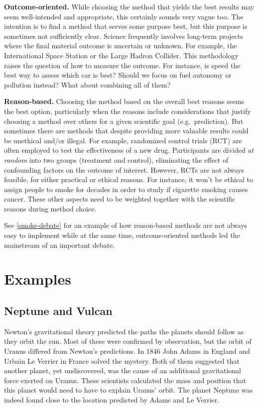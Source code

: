 \documentclass[
]{book}
\begin{document}
\textbf{Outcome-oriented.} While choosing the method that yields the best results may seem well-intended and appropriate, this certainly sounds very vague too. The intention is to find a method that serves some purpose best, but this purpose is sometimes not sufficiently clear. Science frequently involves long-term projects where the final material outcome is uncertain or unknown. For example, the International Space Station or the Large Hadron Collider. This methodology raises the question of how to measure the outcome. For instance, is speed the best way to assess which car is best? Should we focus on fuel autonomy or pollution instead? What about combining all of them?

\textbf{Reason-based.} Choosing the method based on the overall best reasons seems the best option, particularly when the reasons include considerations that justify choosing a method over others for a given scientific goal (e.g.~prediction). But sometimes there are methods that despite providing more valuable results could be unethical and/or illegal. For example, randomized control trials (RCT) are often employed to test the effectiveness of a new drug. Participants are divided \emph{at random} into two groups (treatment and control), eliminating the effect of confounding factors on the outcome of interest. However, RCTs are not always feasible, for either practical or ethical reasons. For instance, it won't be ethical to assign people to smoke for decades in order to study if cigarette smoking causes cancer. These other aspects need to be weighted together with the scientific reasons during method choice.

See \ref{smoke-debate} for an example of how reason-based methods are not always easy to implement while at the same time, outcome-oriented methods led the mainstream of an important debate.

\hypertarget{examples}{%
\section{Examples}\label{examples}}

\hypertarget{neptune-vulcan}{%
\subsection{Neptune and Vulcan}\label{neptune-vulcan}}

Newton's gravitational theory predicted the paths the planets should follow as they orbit the sun. Most of these were confirmed by observation, but the orbit of Uranus differed from Newton's predictions. In 1846 John Adams in England and Urbain Le Verrier in France solved the mystery. Both of them suggested that another planet, yet undiscovered, was the cause of an additional gravitational force exerted on Uranus. These scientists calculated the mass and position that this planet would need to have to explain Uranus' orbit. The planet Neptune was indeed found close to the location predicted by Adams and Le Verrier.
\end{document}
